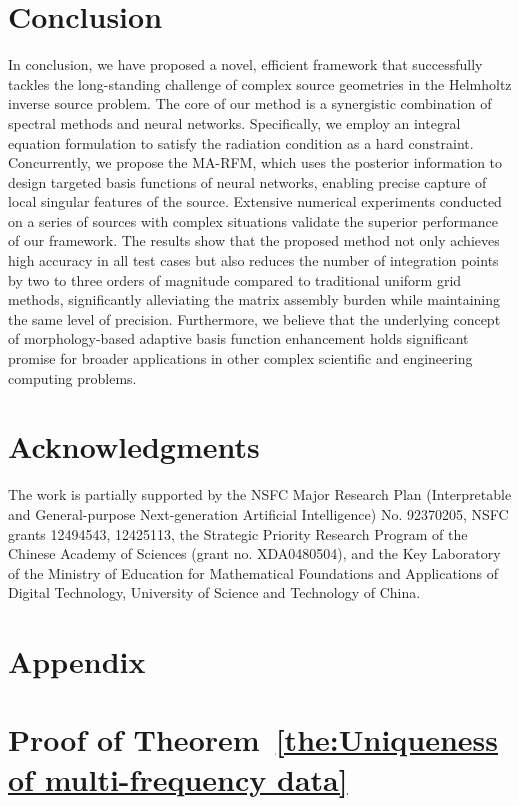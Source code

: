 \documentclass{article}
\theoremstyle{plain}
\theoremstyle{definition}
\begin{document}
{\section{Conclusion}
In conclusion, we have proposed a novel, efficient framework that successfully tackles the long-standing challenge of complex source geometries in the Helmholtz inverse source problem. The core of our method is a synergistic combination of spectral methods and neural networks. Specifically, we employ an integral equation formulation to satisfy the radiation condition as a hard constraint. Concurrently, we propose the MA-RFM, which uses the posterior information to design targeted basis functions of neural networks, enabling precise capture of local singular features of the source. Extensive numerical experiments conducted on a series of sources with complex situations validate the superior performance of our framework.  {The results show that the proposed method not only achieves high accuracy in all test cases but also reduces the number of integration points by two to three orders of magnitude compared to traditional uniform grid methods, significantly alleviating the matrix assembly burden while maintaining the same level of precision.} Furthermore, we believe that the underlying concept of morphology-based adaptive basis function enhancement holds significant promise for broader applications in other complex scientific and engineering computing problems.

\section*{Acknowledgments}
The work is partially supported by the NSFC Major Research Plan (Interpretable and General-purpose Next-generation Artificial Intelligence) No. 92370205, NSFC grants 12494543, 12425113, 
the Strategic Priority Research Program of the Chinese Academy of Sciences (grant no. XDA0480504), 
and the Key Laboratory of the Ministry of Education for Mathematical Foundations and Applications of Digital Technology, University of Science and Technology of China.

\appendix
\section*{Appendix}
\section{Proof of Theorem~\ref{the:Uniqueness of multi-frequency data}}

}
\end{document}
